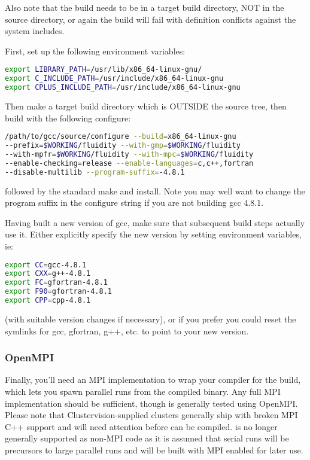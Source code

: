 Also note that the build needs to be in a target build directory, NOT in the
source directory, or again the build will fail with definition conflicts
against the system includes.

First, set up the following environment variables:
\begin{lstlisting}[language=bash]
export LIBRARY_PATH=/usr/lib/x86_64-linux-gnu/
export C_INCLUDE_PATH=/usr/include/x86_64-linux-gnu
export CPLUS_INCLUDE_PATH=/usr/include/x86_64-linux-gnu
\end{lstlisting}

Then make a target build directory which is OUTSIDE the source tree, then build
with the following configure:

\begin{lstlisting}[language=bash]
/path/to/gcc/source/configure --build=x86_64-linux-gnu
--prefix=$WORKING/fluidity --with-gmp=$WORKING/fluidity
--with-mpfr=$WORKING/fluidity --with-mpc=$WORKING/fluidity
--enable-checking=release --enable-languages=c,c++,fortran 
--disable-multilib --program-suffix=-4.8.1
\end{lstlisting}

followed by the standard make and install. Note you may well want to change the
program suffix in the configure string if you are not building gcc 4.8.1.

Having built a new version of gcc, make sure that subsequent build steps
actually use it. Either explicitly specify the new version by setting
environment variables, ie:

\begin{lstlisting}[language=bash]
export CC=gcc-4.8.1
export CXX=g++-4.8.1
export FC=gfortran-4.8.1
export F90=gfortran-4.8.1
export CPP=cpp-4.8.1
\end{lstlisting}

(with suitable version changes if necessary), or if you prefer you could reset
the symlinks for gcc, gfortran, g++, etc. to point to your new version.

\subsubsection{OpenMPI}
\label{sec:required_libraries_compilers_openmpi}

Finally, you'll need an MPI implementation to wrap your compiler for the
\fluidity build, which lets you spawn parallel runs from the compiled \fluidity
binary. Any full MPI implementation should be sufficient, though \fluidity is
generally tested using OpenMPI. Please note that Clustervision-supplied
clusters generally ship with broken MPI C++ support and will need attention
before \fluidity can be compiled. \fluidity is no longer generally supported as
non-MPI code as it is assumed that serial runs will be precursors to large
parallel runs and will be built with MPI enabled for later use.

